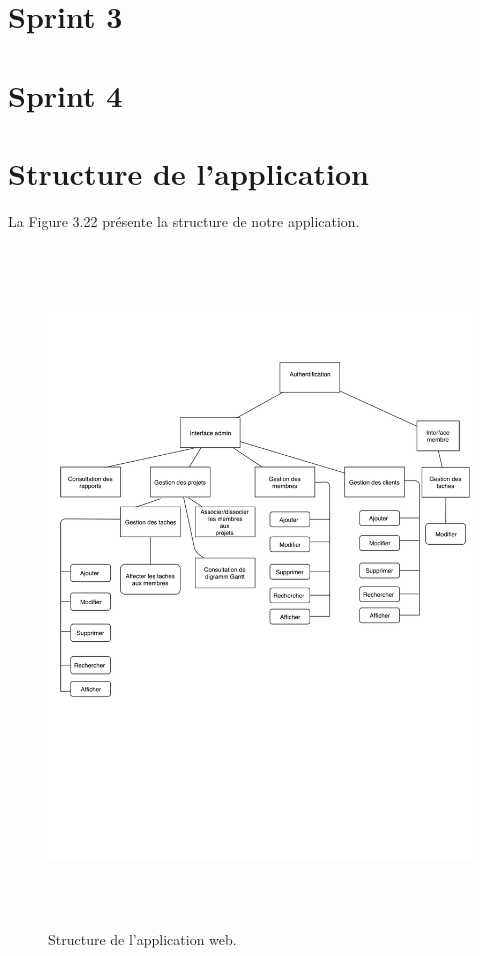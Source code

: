 \newpage
\section{ Sprint 3 }


\section{ Sprint 4 }


\section{Structure de l'application}
La Figure 3.22 pr\'{e}sente la structure de notre application.

\begin{figure}[H]
\center
\includegraphics[width=14cm,height=18cm]{./figures/structure.png}
\caption{Structure de l'application web.}
\end{figure}








